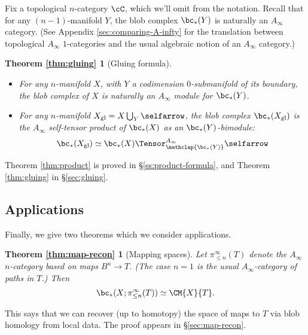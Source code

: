 Fix a topological $n$-category $\cC$, which we'll omit from the notation.
Recall that for any $(n-1)$-manifold $Y$, the blob complex $\bc_*(Y)$ is naturally an $A_\infty$ category.
(See Appendix \ref{sec:comparing-A-infty} for the translation between topological $A_\infty$ $1$-categories and the usual algebraic notion of an $A_\infty$ category.)

\newtheorem*{thm:gluing}{Theorem \ref{thm:gluing}}

\begin{thm:gluing}[Gluing formula]
\mbox{}%
\begin{itemize}
\item For any $n$-manifold $X$, with $Y$ a codimension $0$-submanifold of its boundary, the blob complex of $X$ is naturally an
$A_\infty$ module for $\bc_*(Y)$.

\item For any $n$-manifold $X_\text{gl} = X\bigcup_Y \selfarrow$, the blob complex $\bc_*(X_\text{gl})$ is the $A_\infty$ self-tensor product of
$\bc_*(X)$ as an $\bc_*(Y)$-bimodule:
\begin{equation*}
\bc_*(X_\text{gl}) \simeq \bc_*(X) \Tensor^{A_\infty}_{\mathclap{\bc_*(Y)}} \selfarrow
\end{equation*}
\end{itemize}
\end{thm:gluing}

Theorem \ref{thm:product} is proved in \S \ref{ss:product-formula}, and Theorem \ref{thm:gluing} in \S \ref{sec:gluing}.

\subsection{Applications}
\label{sec:applications}
Finally, we give two theorems which we consider applications. %

\newtheorem*{thm:map-recon}{Theorem \ref{thm:map-recon}}

\begin{thm:map-recon}[Mapping spaces]
Let $\pi^\infty_{\le n}(T)$ denote the $A_\infty$ $n$-category based on maps 
$B^n \to T$.
(The case $n=1$ is the usual $A_\infty$-category of paths in $T$.)
Then 
$$\bc_*(X; \pi^\infty_{\le n}(T)) \simeq \CM{X}{T}.$$
\end{thm:map-recon}

This says that we can recover (up to homotopy) the space of maps to $T$ via blob homology from local data. 
The proof appears in \S \ref{sec:map-recon}.

